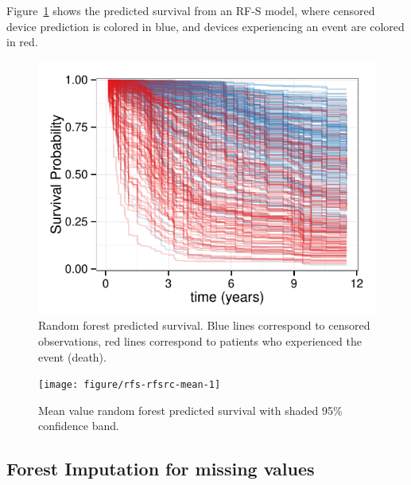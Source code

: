 \documentclass[nojss]{jss}\usepackage[]{graphicx}\usepackage[]{color}
\makeatletter
\def\maxwidth{ %
  \ifdim\Gin@nat@width>\linewidth
    \linewidth
  \else
    \Gin@nat@width
  \fi
}
\makeatother
\begin{document}
Figure~\ref{fig:rfsrc-plot} shows the predicted survival from an RF-S model, where censored device prediction is colored in blue, and devices experiencing an event are colored in red. 
\begin{Schunk}
\begin{figure}[!htpb]

{\centering \includegraphics[width=\maxwidth]{figure/rfs-rfsrc-plot-1} 

}

\caption[Random forest predicted survival]{Random forest predicted survival. Blue lines correspond to censored observations, red lines correspond to patients who experienced the event (death).\label{fig:rfsrc-plot}}
\end{figure}
\end{Schunk}

\begin{Schunk}
\begin{figure}[!htpb]

{\centering \texttt{[image: figure/rfs-rfsrc-mean-1]} 

}

\caption[Mean value random forest predicted survival with shaded 95\% confidence band]{Mean value random forest predicted survival with shaded 95\% confidence band.\label{fig:rfsrc-mean}}
\end{figure}
\end{Schunk}

\subsection{Forest Imputation for missing values}\label{S:imputation}
\end{document}
